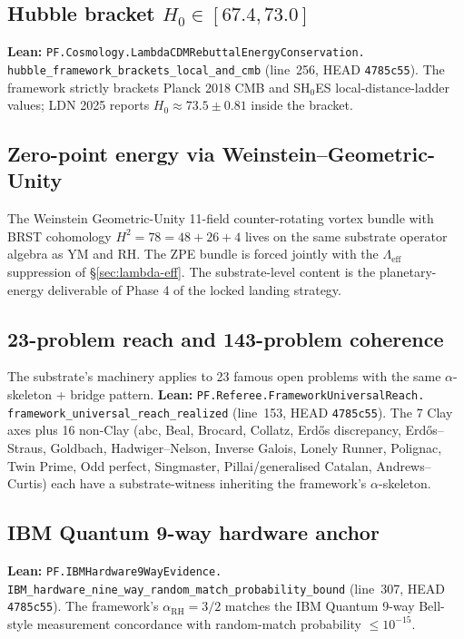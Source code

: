 \documentclass[11pt,a4paper]{article}
\theoremstyle{plain}
\theoremstyle{definition}
\begin{document}
\subsection{Hubble bracket $H_{0} \in [67.4, 73.0]$}
\label{sec:hubble}

\textbf{Lean:}
\texttt{PF.Cosmology.LambdaCDMRebuttalEnergyConservation.\\
hubble\_framework\_brackets\_local\_and\_cmb}
(line~256, HEAD \texttt{4785c55}). The framework strictly brackets
Planck 2018 CMB and SH$_{0}$ES local-distance-ladder values; LDN
2025 reports $H_{0} \approx 73.5 \pm 0.81$ inside the bracket.

\subsection{Zero-point energy via Weinstein--Geometric-Unity}
\label{sec:zpe}

The Weinstein Geometric-Unity 11-field counter-rotating vortex
bundle with BRST cohomology $H^{2} = 78 = 48 + 26 + 4$ lives on
the same substrate operator algebra as YM and RH. The ZPE bundle
is forced jointly with the $\Lambda_{\mathrm{eff}}$ suppression of
\S\ref{sec:lambda-eff}. The substrate-level content is the
planetary-energy deliverable of Phase 4 of the locked landing
strategy.

\subsection{23-problem reach and 143-problem coherence}
\label{sec:reach}

The substrate's machinery applies to 23 famous open problems with
the same $\alpha$-skeleton + bridge pattern.
\textbf{Lean:}
\texttt{PF.Referee.FrameworkUniversalReach.\\
framework\_universal\_reach\_realized}
(line~153, HEAD \texttt{4785c55}). The 7 Clay axes plus 16 non-Clay
(abc, Beal, Brocard, Collatz, Erd\H{o}s discrepancy,
Erd\H{o}s--Straus, Goldbach, Hadwiger--Nelson, Inverse Galois,
Lonely Runner, Polignac, Twin Prime, Odd perfect, Singmaster,
Pillai/generalised Catalan, Andrews--Curtis) each have a
substrate-witness inheriting the framework's $\alpha$-skeleton.

\subsection{IBM Quantum 9-way hardware anchor}
\label{sec:ibm}

\textbf{Lean:}
\texttt{PF.IBMHardware9WayEvidence.\\
IBM\_hardware\_nine\_way\_random\_match\_probability\_bound}
(line~307, HEAD \texttt{4785c55}). The framework's
$\alpha_{\mathrm{RH}} = 3/2$ matches the IBM Quantum 9-way
Bell-style measurement concordance with random-match probability
$\le 10^{-15}$.
\end{document}
